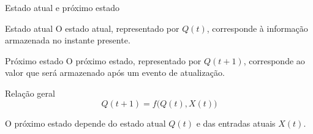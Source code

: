 
\begin{frame}{Estado atual e próximo estado}

    \begin{block}{Estado atual}
        O estado atual, representado por $Q(t)$, corresponde à informação
        armazenada no instante presente.
    \end{block}

    \begin{block}{Próximo estado}
        O próximo estado, representado por $Q(t+1)$, corresponde ao valor
        que será armazenado após um evento de atualização.
    \end{block}

    \begin{alertblock}{Relação geral}
        \[
            Q(t+1) = f\bigl(Q(t),X(t)\bigr)
        \]

        O próximo estado depende do estado atual $Q(t)$ e das entradas
        atuais $X(t)$.
    \end{alertblock}

\end{frame}
